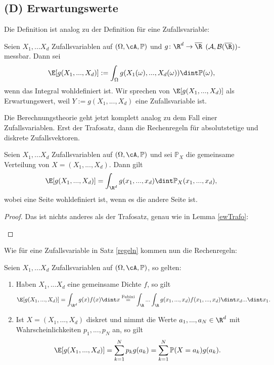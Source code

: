 \subsection*{(D) Erwartungswerte}
Die Definition ist analog zu der Definition f\"ur eine Zufallsvariable:
\begin{deff}
	Seien $X_1,...X_d$ Zufallsvariablen auf $(\Omega, \cA, \mathbb{P})$ und $ g \colon \R^d \to \overline \R$ $(\mathcal A, \mathcal B(\overline \R))$-messbar. Dann sei 
	\[ \E[g(X_1,...,X_d)] := \int_{\Omega} g(X_1(\omega),...,X_d(\omega)) \dint \mathbb{P}(\omega), \]
	wenn das Integral wohldefiniert ist. Wir sprechen von $\E[g(X_1,...,X_d)]$ als Erwartungswert, weil $Y:= g(X_1,...,X_d)$ eine Zufallsvariable ist.
\end{deff}
Die Berechnungstheorie geht jetzt komplett analog zu dem Fall einer Zufallsvariablen. Erst der Trafosatz, dann die Rechenregeln f\"ur absolutstetige und diskrete Zufallsvektoren.
\begin{lemma}\label{gemVert}
	Seien $X_1,...X_d$ Zufallsvariablen auf $(\Omega, \cA, \mathbb{P})$ und sei $\mathbb{P}_X$ die gemeinsame Verteilung von $X = (X_1,...,X_d)$. Dann gilt \[ \E[g(X_1,...,X_d)] = \int_{\R^d} g(x_1,...,x_d) \dint \mathbb{P}_X(x_1,...,x_d), \]
	wobei eine Seite wohldefiniert ist, wenn es die andere Seite ist.
\end{lemma}

\begin{proof}
	Das ist nichts anderes als der Trafosatz, genau wie in Lemma \ref{ewTrafo}:
	\begin{center}		
	\end{center}
\end{proof}
Wie f\"ur eine Zufallsvariable in Satz \ref{regeln} kommen nun die Rechenregeln:
\begin{satz}[Berechnungsregeln]
Seien $X_1,...X_d$ Zufallsvariablen auf $(\Omega, \cA, \mathbb{P})$, so gelten:
	\begin{enumerate}[label=(\roman*)]
		\item Haben $X_1,...X_d$ eine gemeinsame Dichte $f$, so gilt 
		\[ \E[g(X_1,...,X_d)] = \int_{\R^d} g(x) f(x) \dint x \overset{\text{Fubini}}{=} \int_{\R} ... \int_{\R} g(x_1,...,x_d) f(x_1,...,x_d) \dint x_d ... \dint x_1.  \]
		\item Ist $X=(X_1,...,X_d)$ diskret und nimmt die Werte $a_1, ..., a_N\in\R^d$ mit Wahrscheinlichkeiten $p_1, ..., p_N$ an, so gilt \[ \E[g(X_1,...,X_d)]= \sum\limits_{k=1}^{N} p_k g(a_k) = \sum\limits_{k=1}^{N} \mathbb{P}(X=a_k) g(a_k) . \]
	\end{enumerate}
\end{satz}

